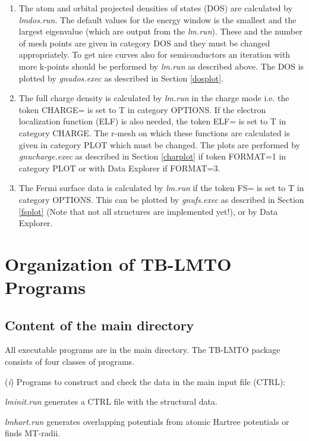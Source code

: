 \documentclass[aps,twocolumn,a4]{revtex4}
\begin{document}
\begin{enumerate}
\item The atom and orbital projected densities of states (DOS) are
calculated
by {\em lmdos.run}. The default values for the energy window is the
smallest and the largest eigenvalue (which are output from the {\em
lm.run}). These and the number of
mesh points are given in category DOS and they must be changed
appropriately.
To get nice curves also for semiconductors an
iteration with more k-points should be performed by {\em lm.run} as
described above.
The DOS is plotted by {\em gnudos.exec} as described in Section
\ref{dosplot}.

\item The full charge density is calculated by {\em lm.run}
in the charge mode i.e. the token CHARGE= is set to T in category
OPTIONS. If the electron localization function (ELF) is also needed, the
token ELF= is set to T in category CHARGE. The r-mesh on which these
functions are calculated is given in category PLOT which must be
changed. The plots are performed by {\em gnucharge.exec} as described
in Section \ref{charplot} if token FORMAT=1 in category PLOT or with
Data Explorer if FORMAT=3.

\item The Fermi surface data is calculated by {\em lm.run} if the
token FS= is set to T in category OPTIONS. This can be plotted by
{\em gnufs.exec} as described in Section \ref{fsplot} (Note that not
all structures are implemented yet!), or by Data Explorer.

\end{enumerate}

%
\section{Organization of TB-LMTO Programs}
\label{organ}

\subsection{Content of the main directory}
All executable programs are in the main directory.
The TB-LMTO package consists of four classes of programs.

({\em i})
Programs to construct and check the data in the main input file (CTRL):

{\em lminit.run} generates a CTRL file with the structural data.

{\em lmhart.run} generates overlapping potentials from atomic
Hartree potentials or finds MT-radii.
\end{document}
